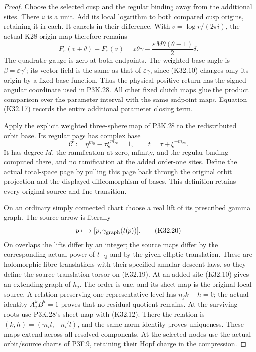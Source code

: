 \begin{proof}
Choose the selected cusp and the regular binding away
from the additional sites. There $u$ is a unit.
Add its local logarithm to both compared cusp origins,
retaining it in each. It cancels in their difference.
With $v=\log r/(2\pi i)$, the actual K28 origin map
therefore remains
\[
 F_\varepsilon(v+\theta)-F_\varepsilon(v)
   =\varepsilon\theta\gamma
        -\frac{\varepsilon M\theta(\theta-1)}2\delta.
                                                               \tag{K32.18}
\]
The quadratic gauge is zero at both endpoints.
The weighted base angle is $\beta=\varepsilon\gamma'$;
its vector field is the same as that of
$\varepsilon\gamma$, since (K32.10) changes only its
origin by a fixed base function. Thus the physical
positive return has the signed angular coordinate
used in P3K.28. All other fixed clutch maps glue the
product comparison over the parameter interval with
the same endpoint maps. Equation (K32.17) records
the entire additional parameter closing term.

Apply the explicit weighted three-sphere map of
P3K.28 to the redistributed orbit base. Its regular
page has complex base
\[
 \mathcal C^\circ:\quad
 \eta^{m_0}-\tau\xi^{m_\infty}=1,\qquad
 t=\tau+\xi^{-m_\infty}.                              \tag{K32.19}
\]
It has degree $M$, the ramification at zero, infinity,
and the regular binding computed there, and no
ramification at the added order-one sites.
Define the actual total-space page by pulling this
page back through the original orbit projection and
the displayed diffeomorphism of bases. This definition
retains every original source and line transition.

On an ordinary simply connected chart choose a real
lift of its prescribed gamma graph. The source arrow
is literally
\[
                 p\longmapsto[p,\gamma_{\rm graph}(t(p))].
                                                               \tag{K32.20}
\]
On overlaps the lifts differ by an integer; the
source maps differ by the corresponding actual
power of $t_{-Q}$ and by the given elliptic
translation. These are holomorphic fibre translations
with their specified annular descent laws, so they
define the source translation torsor on (K32.19).
At an added site (K32.10) gives an extending graph
of $h_j$. The order is one, and its sheet map is
the original local source. A relation preserving
one representative level has $n_jk+h=0$; the actual
identity $A_j^kB^h=1$ proves that no residual quotient
remains. At the surviving roots use P3K.28's sheet
map with (K32.12). There the relation is
$(k,h)=(m_i l,-n_i' l)$, and the same norm identity
proves uniqueness. These maps extend across all
resolved components. At the selected nodes use the
actual orbit/source charts of P3F.9, retaining their
Hopf charge in the compression.


\end{proof}
